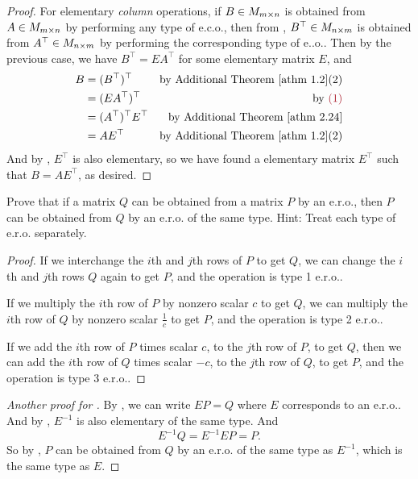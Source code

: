 \begin{proof}
For elementary \emph{column} operations, if \(B \in M_{m \times n}\) is obtained from \(A \in M_{m \times n}\) by performing any type of e.c.o.,
then from , \(B^\top \in M_{n \times m}\) is obtained from \(A^\top \in M_{n \times m}\) by performing the corresponding type of e..o..
Then by the previous case, we have \(B^\top = EA^\top\)  for some elementary matrix \(E\), and
\begin{align*}
    B & = (B^\top)^\top & \text{by \ATHM{1.2}(2)} \\
      & = (EA^\top)^\top & \text{by \MAROON{(1)}} \\
      & = (A^\top)^\top E^\top & \text{by \ATHM{2.24}} \\
      & = A E^\top & \text{by \ATHM{1.2}(2)}
\end{align*}
And by , \(E^\top\) is also elementary, so we have found a elementary matrix \(E^\top\) such that \(B = A E^\top\), as desired.
\end{proof}

\begin{exercise} \label{exercise 3.1.8}
Prove that if a matrix \(Q\) can be obtained from a matrix \(P\) by an e.r.o., then \(P\) can be obtained from \(Q\) by an e.r.o. of the same type.
Hint: Treat each type of e.r.o. separately.
\end{exercise}

\begin{proof}
If we interchange the \(i\)th and \(j\)th rows of \(P\) to get \(Q\), we can change the \(i\)th and \(j\)th rows \(Q\) again to get \(P\), and the operation is type 1 e.r.o..

If we multiply the \(i\)th row of \(P\) by nonzero scalar \(c\) to get \(Q\), we can multiply the \(i\)th row of \(Q\) by nonzero scalar \(\frac1{c}\) to get \(P\), and the operation is type 2 e.r.o..

If we add the \(i\)th row of \(P\) times scalar \(c\), to the \(j\)th row of \(P\), to get \(Q\), then we can add the \(i\)th row of \(Q\) times scalar \(-c\), to the \(j\)th row of \(Q\), to get \(P\), and the operation is type 3 e.r.o..
\end{proof}

\begin{proof} [Another proof for ]
By , we can write \(EP = Q\) where \(E\) corresponds to an e.r.o..
And by , \(E^{-1}\) is also elementary of the same type.
And
\[
    E^{-1} Q = E^{-1} E P = P.
\]
So by , \(P\) can be obtained from \(Q\) by an e.r.o. of the same type as \(E^{-1}\), which is the same type as \(E\).
\end{proof}

